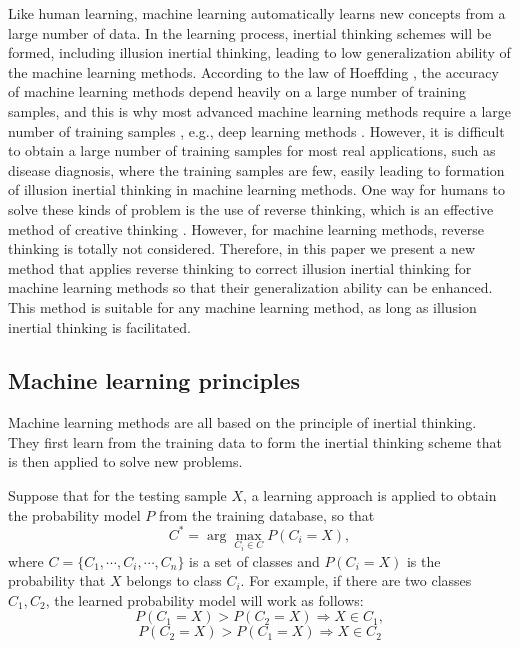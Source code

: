 Like human learning, machine learning automatically learns new concepts from a large number of data. In the learning process, inertial thinking schemes will be formed, including illusion inertial thinking, leading to low generalization ability of the machine learning methods. According to the law of Hoeffding \cite{Hoeffding1963}, the accuracy of machine learning methods depend heavily on a large number of training samples, and this is why most advanced machine learning methods require a large number of training samples \cite{Lake2015}, e.g., deep learning methods \cite{LeCun2015}. However, it is difficult to obtain a large number of training samples for most real applications, such as disease diagnosis, where the training samples are few, easily leading to formation of illusion inertial thinking in machine learning methods. One way for humans to solve these kinds of problem is the use of reverse thinking, which is an effective method of creative thinking \cite{Sawaguchi2015}. However, for machine learning methods, reverse thinking is totally not considered. Therefore, in this paper we present a new method that applies reverse thinking to correct illusion inertial thinking for machine learning methods so that their generalization ability can be enhanced. This method is suitable for any machine learning method, as long as illusion inertial thinking is facilitated.
\subsection{Machine learning principles}
Machine learning methods are all based on the principle of inertial thinking. They first learn from the training data to form the inertial thinking scheme that is then applied to solve new problems.

Suppose that for the testing sample $X$, a learning approach is applied to obtain the probability model $P$ from the training database, so that
\begin{equation}
C^*=\arg\max_{C_i\in C}P(C_i=X),
\end{equation}
where $C=\{C_1,\cdots,C_i,\cdots,C_n\}$ is a set of classes and $P(C_i=X)$ is the probability that $X$ belongs to class $C_i$.
For example, if there are two classes  $C_1,C_2$, the learned probability model will work as follows:
\begin{displaymath}
P(C_1=X)> P(C_2=X)\Longrightarrow X\in C_1,
\end{displaymath}
\begin{displaymath}
P(C_2=X)>P(C_1=X)\Longrightarrow X\in C_2
\end{displaymath}

